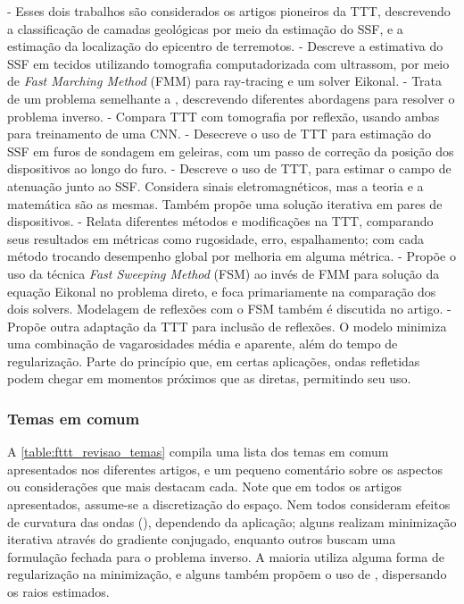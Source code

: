 \begin{itemize}[leftmargin=4pt+]
	 - Esses dois trabalhos são considerados os artigos pioneiros da TTT, descrevendo a classificação de camadas geológicas por meio da estimação do SSF, e a estimação da localização do epicentro de terremotos.
	 - Descreve a estimativa do SSF em tecidos utilizando tomografia computadorizada com ultrassom, por meio de  \textsl{Fast Marching Method} (FMM) para ray-tracing e um solver Eikonal.
	 - Trata de um problema semelhante a \cite{ali_opensource_2019}, descrevendo diferentes abordagens para resolver o problema inverso.
	 - Compara TTT com tomografia por reflexão, usando ambas para treinamento de uma CNN.   
	 - Desecreve o uso de TTT para estimação do SSF em furos de sondagem em geleiras, com um passo de correção da posição dos dispositivos ao longo do furo.
	 - Descreve o uso de  TTT, para estimar o campo de atenuação junto ao SSF. Considera sinais eletromagnéticos, mas a teoria e a matemática são as mesmas. Também propõe uma solução iterativa em pares de dispositivos.
	 - Relata  diferentes métodos e modificações na TTT, comparando seus resultados em métricas como rugosidade, erro, espalhamento; com cada método trocando desempenho global por melhoria em alguma métrica.
	 - Propõe o uso da técnica \textsl{Fast Sweeping Method} (FSM) ao invés de FMM para solução da equação Eikonal no problema direto, e foca primariamente na comparação dos dois solvers. Modelagem de reflexões com o FSM também é discutida no artigo.
	 - Propõe outra adaptação da TTT para inclusão de reflexões. O modelo minimiza uma combinação de vagarosidades média e aparente, além do tempo de regularização. Parte do princípio que, em certas aplicações, ondas refletidas podem chegar em momentos próximos que as diretas, permitindo seu uso.
\end{itemize}

\subsubsection{Temas em comum}
%
\def\X{\ensuremath{\mathsf{X}}}
%
A \cref{table:fttt_revisao_temas} compila uma lista dos temas em comum apresentados nos diferentes artigos, e um pequeno comentário sobre os aspectos ou considerações que mais destacam cada. Note que em todos os artigos apresentados, assume-se a discretização do espaço. Nem todos consideram efeitos de curvatura das ondas (), dependendo da aplicação; alguns realizam minimização iterativa através do gradiente conjugado, enquanto outros buscam uma formulação fechada para o problema inverso. A maioria utiliza alguma forma de regularização na minimização, e alguns também propõem o uso de , dispersando os raios estimados.


